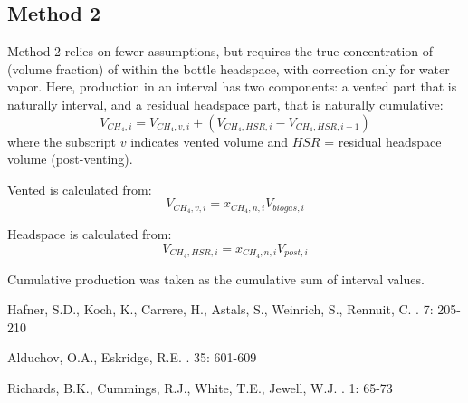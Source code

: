 \documentclass[]{article}
\begin{document}
\subsection{Method 2}
Method 2 relies on fewer assumptions, but requires the true concentration of  (volume fraction) of  within the bottle headspace, with correction only for water vapor.
Here,  production in an interval has two components: a vented part that is naturally interval, and a residual headspace part, that is naturally cumulative:
\begin{equation}
  V_{CH_4, i} = V_{CH_4, v, i} + ( V_{CH_4, HSR, i} - V_{CH_4, HSR, i-1} )
\end{equation}
where the subscript $v$ indicates vented volume and $HSR$ = residual headspace volume (post-venting).

Vented  is calculated from:
\begin{equation}
  V_{CH_4, v, i} = x_{CH_4, n, i} V_{biogas, i}
\end{equation}

Headspace  is calculated from:
\begin{equation}
  V_{CH_4, HSR, i} = x_{CH_4, n, i} V_{post, i}
\end{equation}

Cumulative production was taken as the cumulative sum of interval values. 

\newpage
\begin{thebibliography}{1}

Hafner, S.D., Koch, K., Carrere, H., Astals, S., Weinrich, S., Rennuit, C.
    . 
     7: 205-210

Alduchov, O.A., Eskridge, R.E.    
    . 
     35: 601-609

Richards, B.K., Cummings, R.J., White, T.E., Jewell, W.J.    
    . 
     1: 65-73

\end{thebibliography}


%
\end{document}
